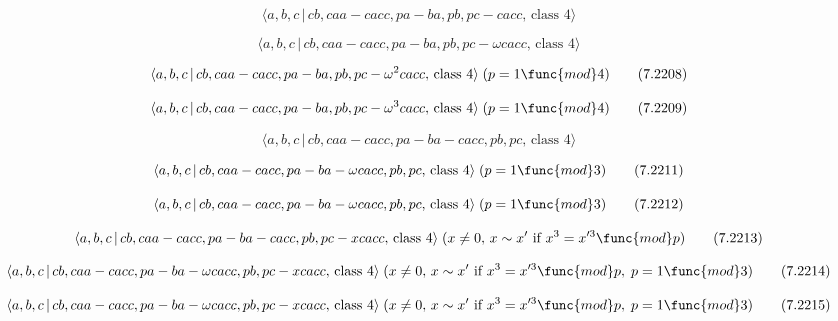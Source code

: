 \documentclass[10pt]{article}
\begin{document}
\begin{equation}
\langle a,b,c\,|\,cb,caa-cacc,pa-ba,pb,pc-cacc,\,\text{class }4\rangle 
\tag{7.2206}
\end{equation}

\begin{equation}
\langle a,b,c\,|\,cb,caa-cacc,pa-ba,pb,pc-\omega cacc,\,\text{class }4\rangle
\tag{7.2207}
\end{equation}

\begin{equation}
\langle a,b,c\,|\,cb,caa-cacc,pa-ba,pb,pc-\omega ^{2}cacc,\,\text{class }%
4\rangle \;(p=1\func{mod}4)  \tag{7.2208}
\end{equation}

\begin{equation}
\langle a,b,c\,|\,cb,caa-cacc,pa-ba,pb,pc-\omega ^{3}cacc,\,\text{class }%
4\rangle \;(p=1\func{mod}4)  \tag{7.2209}
\end{equation}

\begin{equation}
\langle a,b,c\,|\,cb,caa-cacc,pa-ba-cacc,pb,pc,\,\text{class }4\rangle 
\tag{7.2210}
\end{equation}

\begin{equation}
\langle a,b,c\,|\,cb,caa-cacc,pa-ba-\omega cacc,pb,pc,\,\text{class }%
4\rangle \;(p=1\func{mod}3)  \tag{7.2211}
\end{equation}

\begin{equation}
\langle a,b,c\,|\,cb,caa-cacc,pa-ba-\omega cacc,pb,pc,\,\text{class }%
4\rangle \;(p=1\func{mod}3)  \tag{7.2212}
\end{equation}

\begin{equation}
\langle a,b,c\,|\,cb,caa-cacc,pa-ba-cacc,pb,pc-xcacc,\,\text{class }4\rangle
\;(x\neq 0,\,x\sim x^{\prime }\text{ if }x^{3}=x^{\prime 3}\func{mod}p) 
\tag{7.2213}
\end{equation}

\begin{equation}
\langle a,b,c\,|\,cb,caa-cacc,pa-ba-\omega cacc,pb,pc-xcacc,\,\text{class }%
4\rangle \;(x\neq 0,\,x\sim x^{\prime }\text{ if }x^{3}=x^{\prime 3}\func{mod%
}p,\;p=1\func{mod}3)  \tag{7.2214}
\end{equation}

\begin{equation}
\langle a,b,c\,|\,cb,caa-cacc,pa-ba-\omega cacc,pb,pc-xcacc,\,\text{class }%
4\rangle \;(x\neq 0,\,x\sim x^{\prime }\text{ if }x^{3}=x^{\prime 3}\func{mod%
}p,\;p=1\func{mod}3)  \tag{7.2215}
\end{equation}
\end{document}
